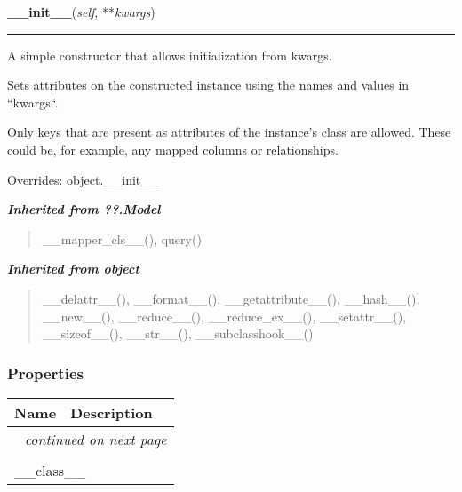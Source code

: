 \hspace{.8\funcindent}\begin{boxedminipage}{\funcwidth}

    \raggedright \textbf{\_\_init\_\_}(\textit{self}, **\textit{kwargs})

    \vspace{-1.5ex}

    \rule{\textwidth}{0.5\fboxrule}
\setlength{\parskip}{2ex}
    A simple constructor that allows initialization from kwargs.

    Sets attributes on the constructed instance using the names and values 
    in ``kwargs``.

    Only keys that are present as attributes of the instance's class are 
    allowed. These could be, for example, any mapped columns or 
    relationships.

\setlength{\parskip}{1ex}
      Overrides: object.\_\_init\_\_

    \end{boxedminipage}


\large{\textbf{\textit{Inherited from ??.Model}}}

\begin{quote}
\_\_mapper\_cls\_\_(), query()
\end{quote}

\large{\textbf{\textit{Inherited from object}}}

\begin{quote}
\_\_delattr\_\_(), \_\_format\_\_(), \_\_getattribute\_\_(), \_\_hash\_\_(), \_\_new\_\_(), \_\_reduce\_\_(), \_\_reduce\_ex\_\_(), \_\_setattr\_\_(), \_\_sizeof\_\_(), \_\_str\_\_(), \_\_subclasshook\_\_()
\end{quote}


  \subsubsection{Properties}

    \vspace{-1cm}
\hspace{\varindent}\begin{longtable}{|p{\varnamewidth}|p{\vardescrwidth}|l}
\cline{1-2}
\cline{1-2} \centering \textbf{Name} & \centering \textbf{Description}& \\
\cline{1-2}
\endhead\cline{1-2}\multicolumn{3}{r}{\small\textit{continued on next page}}\\\endfoot\cline{1-2}
\endlastfoot\multicolumn{2}{|l|}{\textit{Inherited from object}}\\
\multicolumn{2}{|p{\varwidth}|}{\raggedright \_\_class\_\_}\\
\cline{1-2}
\end{longtable}



